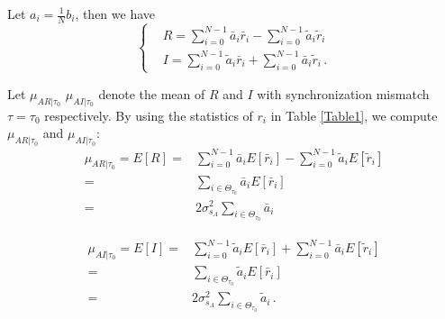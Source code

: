 Let $a_i = \frac{1}{N}b_i$, then we have 
\begin{equation}
  \begin{cases}
	&R = \sum_{i=0}^{N-1}\bar{a}_i\bar{r}_i - \sum_{i=0}^{N-1}\tilde{a}_i\tilde{r}_i\\
	&I = \sum_{i=0}^{N-1}\tilde{a}_i\bar{r}_i +\sum_{i=0}^{N-1}\bar{a}_i\tilde{r}_i\,.
  \end{cases}
  \label{definitionofRI}
\end{equation}

Let $\mu_{AR|\tau_0}$ $\mu_{AI|\tau_0}$ denote the mean of $R$ and $I$ with synchronization mismatch $\tau=\tau_0$ respectively. By using the statistics of $r_i$ in Table \ref{Table1}, we compute  $\mu_{AR|\tau_0}$ and  $\mu_{AI|\tau_0}$:
\begin{equation}
  \begin{split}
	\mu_{AR|\tau_0} =  E[R] = &\sum_{i=0}^{N-1}\bar{a}_iE[\bar{r}_i] - \sum_{i=0}^{N-1}\tilde{a}_iE[\tilde{r}_i]\\
	= &\sum_{i\in\Theta_{\tau_0}}\bar{a}_iE[\bar{r}_i]\\
	= &2\sigma_{s_A}^2\sum_{i\in\Theta_{\tau_0}}\bar{a}_i
  \end{split}
  \label{ER}
\end{equation}

\begin{equation}
  \begin{split}
	\mu_{AI|\tau_0} =  E[I] = &\sum_{i=0}^{N-1}\tilde{a}_iE[\bar{r}_i] + \sum_{i=0}^{N-1}\bar{a}_iE[\tilde{r}_i]\\
	= &\sum_{i\in\Theta_{\tau_0}}\tilde{a}_iE[\bar{r}_i]\\
    = &2\sigma_{s_A}^2\sum_{i\in\Theta_{\tau_0}}\tilde{a}_i\,.
  \end{split}
  \label{EI}
\end{equation}

